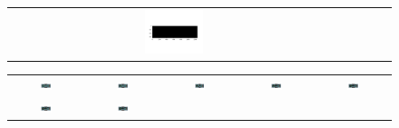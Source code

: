 \documentclass[12pt]{article}
\begin{document}
\begin{figure}[!h]
\begin{tabular}{ccccc}
		\includegraphics[width=0.18\textwidth]{figures/empty-room_FixedAgent/8.png}
	\end{tabular}
	\vspace{-20pt}
	\begin{tabular}{ccccc}
		\includegraphics[width=0.18\textwidth]{figures/room-with-lava_FixedAgent/0.png} &
		\includegraphics[width=0.18\textwidth]{figures/room-with-lava_FixedAgent/1.png} &
		\includegraphics[width=0.18\textwidth]{figures/room-with-lava_FixedAgent/2.png} &
		\includegraphics[width=0.18\textwidth]{figures/room-with-lava_FixedAgent/3.png} &
		\includegraphics[width=0.18\textwidth]{figures/room-with-lava_FixedAgent/4.png}   \\
		\includegraphics[width=0.18\textwidth]{figures/room-with-lava_FixedAgent/5.png} &
		\includegraphics[width=0.18\textwidth]{figures/room-with-lava_FixedAgent/6.png} &

\end{tabular}
\end{figure}
\end{document}
